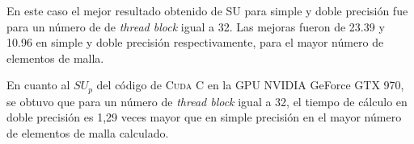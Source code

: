 En este caso el mejor resultado obtenido de SU para simple y doble precisión fue para un número de  de \textit{thread block} igual a 32. Las mejoras fueron de 23.39 y 10.96 en simple y doble precisión respectivamente, para el mayor número de elementos de malla. 

En cuanto al $SU_p$ del código de \textsc{Cuda C} en la GPU NVIDIA GeForce GTX 970, se obtuvo que para un número de \textit{thread block} igual a 32, el tiempo de cálculo en doble precisión es 1,29 veces mayor que en simple precisión en el mayor número de elementos de malla calculado. 


